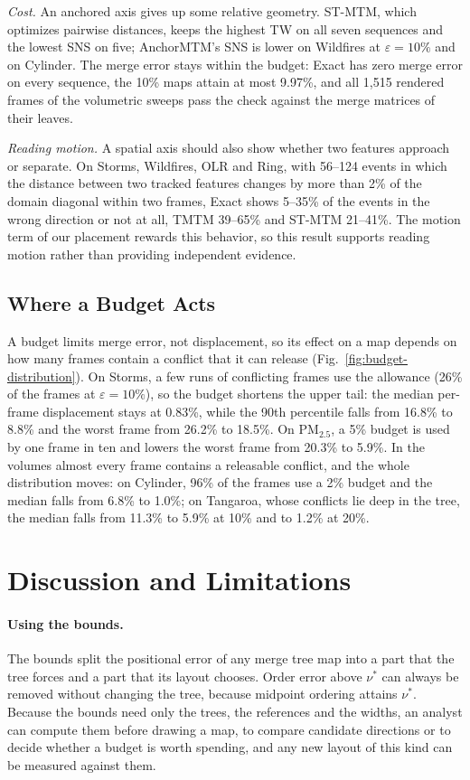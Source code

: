 \documentclass[preprint]{vgtc}   %
\begin{document}
\emph{Cost.} An anchored axis gives up some relative geometry. ST-MTM, which optimizes pairwise distances, keeps the highest TW on all seven sequences and the lowest SNS on five; AnchorMTM's SNS is lower on Wildfires at $\varepsilon=10\%$ and on Cylinder. The merge error stays within the budget: Exact has zero merge error on every sequence, the 10\% maps attain at most 9.97\%, and all 1,515 rendered frames of the volumetric sweeps pass the check against the merge matrices of their leaves.

\emph{Reading motion.} A spatial axis should also show whether two features approach or separate. On Storms, Wildfires, OLR and Ring, with 56--124 events in which the distance between two tracked features changes by more than 2\% of the domain diagonal within two frames, Exact shows 5--35\% of the events in the wrong direction or not at all, TMTM 39--65\% and ST-MTM 21--41\%. The motion term of our placement rewards this behavior, so this result supports reading motion rather than providing independent evidence.

\subsection{Where a Budget Acts}\label{sec:eval-budget}
A budget limits merge error, not displacement, so its effect on a map depends on how many frames contain a conflict that it can release (Fig.~\ref{fig:budget-distribution}). On Storms, a few runs of conflicting frames use the allowance (26\% of the frames at $\varepsilon=10\%$), so the budget shortens the upper tail: the median per-frame displacement stays at 0.83\%, while the 90th percentile falls from 16.8\% to 8.8\% and the worst frame from 26.2\% to 18.5\%. On PM$_{2.5}$, a 5\% budget is used by one frame in ten and lowers the worst frame from 20.3\% to 5.9\%. In the volumes almost every frame contains a releasable conflict, and the whole distribution moves: on Cylinder, 96\% of the frames use a 2\% budget and the median falls from 6.8\% to 1.0\%; on Tangaroa, whose conflicts lie deep in the tree, the median falls from 11.3\% to 5.9\% at 10\% and to 1.2\% at 20\%.

\section{Discussion and Limitations}
\paragraph{Using the bounds.} The bounds split the positional error of any merge tree map into a part that the tree forces and a part that its layout chooses. Order error above $\nu^*$ can always be removed without changing the tree, because midpoint ordering attains $\nu^*$. Because the bounds need only the trees, the references and the widths, an analyst can compute them before drawing a map, to compare candidate directions or to decide whether a budget is worth spending, and any new layout of this kind can be measured against them.
\end{document}
